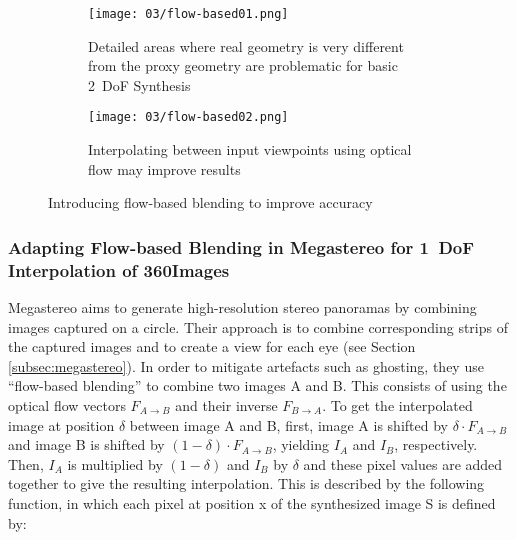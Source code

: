 \begin{figure}
\centering
    \hfill
    \begin{subfigure}[t]{0.4\textwidth}            
            \centering
            \texttt{[image: 03/flow-based01.png]}
            \caption{Detailed areas where real geometry is very different from the proxy geometry are problematic for basic 2~DoF Synthesis}
    \end{subfigure}%
    \hfill
    \begin{subfigure}[t]{0.4\textwidth}
            \centering
            \texttt{[image: 03/flow-based02.png]}
            \caption{Interpolating between input viewpoints using optical flow may improve results}
    \end{subfigure}
    \hfill
    \hfill
  \caption[Flow-based blending to improve accuracy in close, detailed areas]{Introducing flow-based blending to improve accuracy} \label{fig:flow-based-mot}
\end{figure}


\subsubsection{Adapting Flow-based Blending in Megastereo for 1~DoF Interpolation of 360\degree Images}
Megastereo \cite{megastereo} aims to generate high-resolution stereo panoramas by combining images captured on a circle. Their approach is to combine corresponding strips of the captured images and to create a view for each eye (see Section \ref{subsec:megastereo}). In order to mitigate artefacts such as ghosting, they use ``flow-based blending'' to combine two images A and B. This consists of using the optical flow vectors $F_{A\rightarrow B}$ and their inverse $F_{B\rightarrow A}$. To get the interpolated image at position $\delta$ between image A and B, first, image A is shifted by $\delta \cdot F_{A\to B}$ and image B is shifted by $(1 - \delta) \cdot F_{A\to B}$, yielding $I_A$ and $I_B$, respectively. Then, $I_A$ is multiplied by $(1-\delta)$ and $I_B$ by $\delta$ and these pixel values are added together to give the resulting interpolation. This is described by the following function, in which each pixel at position x of the synthesized image S is defined by: 

